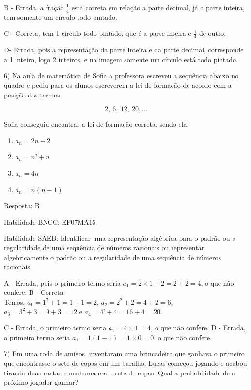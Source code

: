 {B - Errada, a fração \(\frac{1}{4}\) está correta em relação a parte
decimal, já a parte inteira, tem somente um círculo todo pintado.

C - Correta, tem 1 círculo todo pintado, que é a parte inteira e
\(\frac{1}{4}\) de outro.

D- Errada, pois a representação da parte inteira e da parte decimal,
corresponde a 1 inteiro, logo 2 inteiros, e na imagem somente um círculo
está todo pintado.

6) Na aula de matemática de Sofia a professora escreveu a sequência
abaixo no quadro e pediu para os alunos escreverem a lei de formação de
acordo com a posição dos termos.

\[2,\ 6,\ 12,\ 20,\ldots\]

Sofia conseguiu encontrar a lei de formação correta, sendo ela:

\begin{enumerate}
\def\labelenumi{\alph{enumi})}
\item
  \(a_{n} = 2n + 2\)
\item
  \(a_{n} = n² + n\)
\item
  \(a_{n} = 4n\)
\item
  \(a_{n} = n(n - 1)\)
\end{enumerate}

Resposta: B

Habilidade BNCC: EF07MA15

Habilidade SAEB: Identificar uma representação algébrica para o padrão
ou a regularidade de uma sequência de números racionais ou representar
algebricamente o padrão ou a regularidade de uma sequência de números
racionais.

A - Errada, pois o primeiro termo seria
\(a_{1} = 2 \times 1 + 2 = 2 + 2 = 4\), o que não confere. B -
Correta.\\
Temos, \(a_{1} = 1^{2} + 1 = 1 + 1 = 2\),
\(a_{2} = 2^{2} + 2 = 4 + 2 = 6\), \(a_{3} = 3^{2} + 3 = 9 + 3 = 12\) e
\(a_{4} = 4² + 4 = 16 + 4 = 20\).

C - Errada, o primeiro termo seria \(a_{1} = 4 \times 1 = 4\)\emph{,} o
que não confere.\emph{\hfill\break
}D - Errada, o primeiro termo seria
\(a_{1} = 1\left( 1 - 1 \right) = 1 \times 0 = 0\), o que não confere.

7) Em uma roda de amigos, inventaram uma brincadeira que ganhava o
primeiro que encontrasse o sete de copas em um baralho. Lucas começou
jogando e acabou tirando duas cartas e nenhuma era o sete de copas. Qual
a probabilidade de o próximo jogador ganhar?

}
